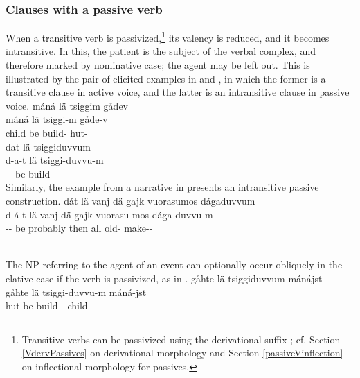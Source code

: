 \subsubsection{Clauses with a passive verb}\label{passiveVoice}
When a transitive verb is passivized,\footnote{Transitive verbs can be passivized using the derivational suffix ; cf. Section \ref{VdervPassives} on derivational morphology and Section \ref{passiveVinflection} on inflectional morphology for passives.} 
its valency is reduced, and it becomes intransitive. In this, the patient is the subject of the verbal complex, and therefore marked by nominative case; the agent may be left out. This is illustrated by the pair of elicited examples in  and , in which the former is a transitive clause in active voice, and the latter is an intransitive clause in passive voice. %
\ea\label{passVoiceEx1}%
\glll	máná lä tsiggim gådev\\
	máná lä tsiggi-m gåde-v\\
	child\BS{} be\BS{} build- hut-\\\nopagebreak
{}	
\z
\ea\label{passVoiceEx2}%
\glll	dat lä tsiggiduvvum\\
	d-a-t lä tsiggi-duvvu-m\\
	-- be\BS{} build--\\\nopagebreak
{}	
\z
Similarly, the example from a narrative in  presents an intransitive passive construction.
\ea\label{passVoiceEx2b}%
\glll	dát lä vanj dä gajk vuorasumos dágaduvvum\\
	d-á-t lä vanj dä gajk vuorasu-mos dága-duvvu-m\\
	-- be\BS{} probably then all old-\BS{} make--\\\nopagebreak
{}\\	
\z

The NP referring to the agent of an event can optionally occur obliquely in the elative case if the verb is passivized, as in . \ea\label{passVoiceEx3}%
\glll	gåhte lä tsiggiduvvum mánájst\\
	gåhte lä tsiggi-duvvu-m máná-jst\\
	hut\BS{} be\BS{} build-- child-\\\nopagebreak
{}	
\z



